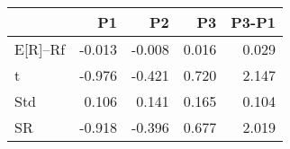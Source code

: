 \begin{tabular}{lrrrr}
\toprule
 & P1 & P2 & P3 & P3-P1 \\
\midrule
E[R]--Rf & -0.013 & -0.008 & 0.016 & 0.029 \\
t & -0.976 & -0.421 & 0.720 & 2.147 \\
Std & 0.106 & 0.141 & 0.165 & 0.104 \\
SR & -0.918 & -0.396 & 0.677 & 2.019 \\
\bottomrule
\end{tabular}
